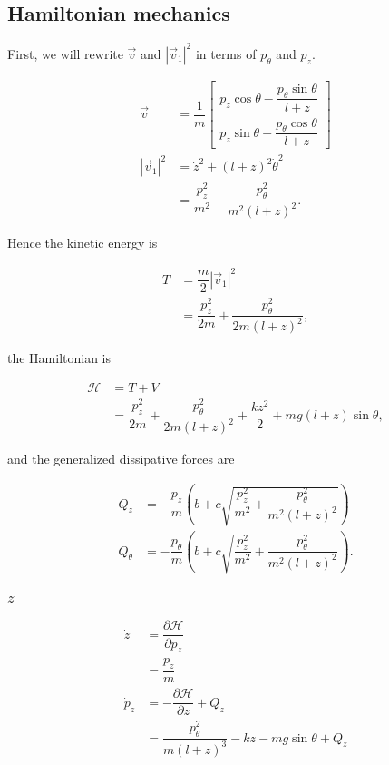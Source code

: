 \documentclass[12pt,a4paper,portrait]{article}
\newcommand{\ham}{\mathcal{H}}
\begin{document}
\subsection{Hamiltonian mechanics}
First, we will rewrite $\vec{v}$ and $|\vec{v}_1|^2$ in terms of $p_{\theta}$ and $p_z$. 

\begin{align*}
	\vec{v} &= \dfrac{1}{m}\begin{bmatrix}
		p_z\cos{\theta} - \dfrac{p_{\theta}\sin{\theta}}{l+z}\\
		p_z\sin{\theta} + \dfrac{p_{\theta}\cos{\theta}}{l+z}
	\end{bmatrix} \\
	|\vec{v}_1|^2 &= \dot{z}^2 + (l+z)^2 \dot{\theta}^2 \\
	&= \dfrac{p_z^2}{m^2} + \dfrac{p_{\theta}^2}{m^2(l+z)^2}.
\end{align*}

Hence the kinetic energy is

\begin{align*}
	T &= \dfrac{m}{2} |\vec{v}_1|^2 \\
	&= \dfrac{p_z^2}{2m} + \dfrac{p_{\theta}^2}{2m(l+z)^2},
\end{align*}

the Hamiltonian is

\begin{align*}
	\ham &= T + V\\
	&= \dfrac{p_z^2}{2m} + \dfrac{p_{\theta}^2}{2m(l+z)^2} + \dfrac{kz^2}{2} + mg(l+z)\sin{\theta},
\end{align*}

and the generalized dissipative forces are

\begin{align*}
	Q_z &= -\dfrac{p_z}{m}\left(b+c\sqrt{\dfrac{p_z^2}{m^2} + \dfrac{p_{\theta}^2}{m^2(l+z)^2}}\right) \\
	Q_{\theta} &= -\dfrac{p_{\theta}}{m} \left(b+c\sqrt{\dfrac{p_z^2}{m^2} + \dfrac{p_{\theta}^2}{m^2(l+z)^2}}\right).
\end{align*}

\subsubsection{$z$}
\begin{align*}
	\dot{z} &= \dfrac{\partial \ham}{\partial p_z} \\
	&= \dfrac{p_z}{m} \\
	\dot{p}_z &= -\dfrac{\partial \ham}{\partial z} + Q_z\\
	&= \dfrac{p_{\theta}^2}{m(l+z)^3} - kz - mg\sin{\theta} + Q_z
\end{align*}
\end{document}
